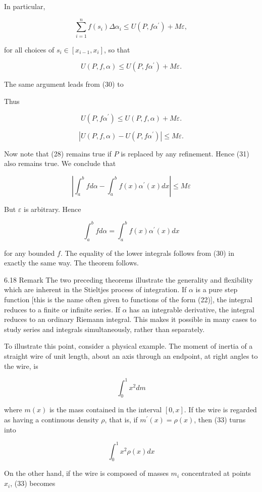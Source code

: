 \documentclass[10pt]{article}
\begin{document}
In particular,

$$
\sum_{i=1}^{n} f\left(s_{i}\right) \Delta \alpha_{i} \leq U\left(P, f \alpha^{\prime}\right)+M \varepsilon,
$$

for all choices of $s_{i} \in\left[x_{i-1}, x_{i}\right]$, so that

$$
U(P, f, \alpha) \leq U\left(P, f \alpha^{\prime}\right)+M \varepsilon .
$$

The same argument leads from (30) to

Thus

$$
U\left(P, f \alpha^{\prime}\right) \leq U(P, f, \alpha)+M \varepsilon .
$$

$$
\left|U(P, f, \alpha)-U\left(P, f \alpha^{\prime}\right)\right| \leq M \varepsilon .
$$

Now note that (28) remains true if $P$ is replaced by any refinement. Hence (31) also remains true. We conclude that

$$
\left|\int_{a}^{b} f d \alpha-\int_{a}^{b} f(x) \alpha^{\prime}(x) d x\right| \leq M \varepsilon
$$

But $\varepsilon$ is arbitrary. Hence

$$
\int_{a}^{b} f d \alpha=\int_{a}^{b} f(x) \alpha^{\prime}(x) d x
$$

for any bounded $f$. The equality of the lower integrals follows from (30) in exactly the same way. The theorem follows.

6.18 Remark The two preceding theorems illustrate the generality and flexibility which are inherent in the Stieltjes process of integration. If $\alpha$ is a pure step function [this is the name often given to functions of the form (22)], the integral reduces to a finite or infinite series. If $\alpha$ has an integrable derivative, the integral reduces to an ordinary Riemann integral. This makes it possible in many cases to study series and integrals simultaneously, rather than separately.

To illustrate this point, consider a physical example. The moment of inertia of a straight wire of unit length, about an axis through an endpoint, at right angles to the wire, is

$$
\int_{0}^{1} x^{2} d m
$$

where $m(x)$ is the mass contained in the interval $[0, x]$. If the wire is regarded as having a continuous density $\rho$, that is, if $m^{\prime}(x)=\rho(x)$, then (33) turns into

$$
\int_{0}^{1} x^{2} \rho(x) d x
$$

On the other hand, if the wire is composed of masses $m_{i}$ concentrated at points $x_{i}$, (33) becomes
\end{document}
